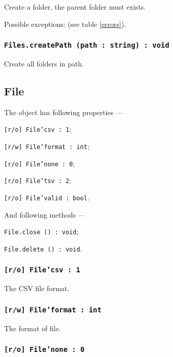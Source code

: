 Create a folder, the parent folder must exists.

Possible exceptions:  (see table \ref{errors}).

\subsubsection{\texttt{Files.createPath (path : string) : void}}

Create all folders in path.

\subsection{{\color{orange} File}}

The object \file{} has following properties —
\begin{icItems}
	\item \texttt{[r/o] File'csv : 1};
	\item \texttt{[r/w] File'format : int};
	\item \texttt{[r/o] File'none : 0};
	\item \texttt{[r/o] File'tsv : 2};
	\item \texttt{[r/o] File'valid : bool}.
\end{icItems}

And following methods —
\begin{icItems}
	\item \texttt{File.close () : void};
	\item \texttt{File.delete () : void}.
\end{icItems}

\subsubsection{\texttt{[r/o] File'csv : 1}}

The CSV file format.

\subsubsection{\texttt{[r/w] File'format : int}}

The format of file.

\subsubsection{\texttt{[r/o] File'none : 0}}

